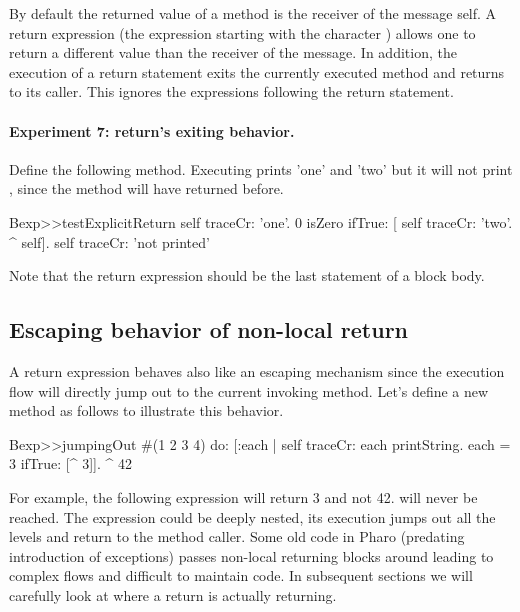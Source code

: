\documentclass[a4paper,10pt,twoside]{book}
\begin{document}
By default the returned value of a method is the receiver of the message \ie self.
A return expression (the expression starting with the character \ct{^}) allows one to return a different value than the receiver of the message. In addition, the execution of a return statement exits the currently executed method and returns to its caller. This ignores the expressions following the return statement.

\paragraph{Experiment 7: return's exiting behavior.}
Define the following method. Executing   prints 'one' and 'two' but it will not print , since the method  will have returned before.

\begin{code}{}
Bexp>>testExplicitReturn
	self traceCr: 'one'.
	0 isZero ifTrue: [ self traceCr: 'two'. ^ self].
	self traceCr: 'not printed'
\end{code}

Note that the return expression should be the last statement of a block body.

%
%


\subsection{Escaping behavior of non-local return}
A return expression behaves also like an escaping mechanism since the execution flow will directly jump out to the current invoking method. Let's define a new method  as follows to illustrate this behavior.

\begin{code}{}
Bexp>>jumpingOut
	#(1 2 3 4) do: [:each |
					self traceCr: each printString.
					each = 3
						ifTrue: [^ 3]].
	^ 42
\end{code}


For example, the following expression  will return 3 and not 42.  will never be reached. The expression \ct{[ ^3 ]} could be deeply nested, its execution jumps out all the levels and return to the method caller. Some old code in Pharo (predating introduction of exceptions) passes non-local returning blocks around leading to complex flows and difficult to maintain code. In subsequent sections we will carefully look at where a return is actually returning.
\end{document}

